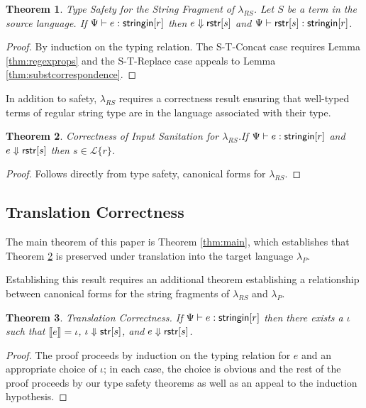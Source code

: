 \documentclass[9pt]{sig-alternate}
\newtheorem{thm}{Theorem}
\theoremstyle{definition}
\newcommand{\Lagr}{\mathcal{L}}
\newcommand{\lang}[1]{\Lagr\{#1\}}
\newcommand{\lambdas}{\lambda_{RS}}
\newcommand{\lambdap}{\lambda_P}
\newcommand{\sistr}[1]{{\sf rstr}[#1]}   \newcommand{\rstr}[1]{{\sf rstr}[#1]} %
\newcommand{\strin}[1]{\sistr{#1}}
\newcommand{\stringin}[1]{{\sf stringin}[#1]}
\renewcommand{\tstr}[1]{{{\sf str}[#1]}}
\newcommand{\trden}[1]{\llbracket #1 \rrbracket} %
\newcommand{\treduces}{ \Downarrow }
\newcommand{\sreduces}{ \Downarrow }
\begin{document}
\begin{thm}{Type Safety for the String Fragment of $\lambdas$.} \label{thm:scorrect}
  Let $S$ be a term in the source language. If $\sctx \vdash e : \stringin{r}$ 
  then $e \sreduces \rstr{s}$ and $\sctx \vdash \rstr{s} : \stringin{r}$.
\end{thm}
\begin{proof}
By induction on the typing relation.
The S-T-Concat case requires Lemma \ref{thm:regexprops} 
and the S-T-Replace case appeals to Lemma \ref{thm:substcorrespondence}.
\end{proof}

In addition to safety, $\lambdas$ requires a correctness result ensuring that well-typed terms of regular string type are in the language associated with their type.

\begin{thm}{Correctness of Input Sanitation for $\lambdas$.}\label{thm:scorrect}
  If  $\sctx \vdash e : \stringin{r}$ and $e \sreduces \rstr{s}$ then $s \in \lang{r}$.
\end{thm}
\begin{proof}
  Follows directly from type safety, canonical forms for $\lambdas$.
\end{proof}


\subsection{Translation Correctness}

The main theorem of this paper is Theorem \ref{thm:main},
which establishes that Theorem \ref{thm:scorrect} is preserved under translation
into the target language $\lambdap$.

Establishing this result requires an additional theorem establishing a relationship between canonical forms for the string fragments of $\lambdas$ and $\lambdap$.

\begin{thm}{Translation Correctness.} \label{thm:tcorrect}
If $\sctx \vdash e : \stringin{r}$ then there exists a $\iota$ such that $\trden{e} = \iota$, 
$\iota \treduces \tstr{s}$, and $e \sreduces \strin{s}$.
\end{thm}

\begin{proof}
The proof proceeds by induction on the typing relation for $e$ and an appropriate
choice of $\iota$; in each case, the choice is obvious and the rest of the proof
proceeds by our type safety theorems as well as an appeal to the induction hypothesis.
\end{proof}
\end{document}
